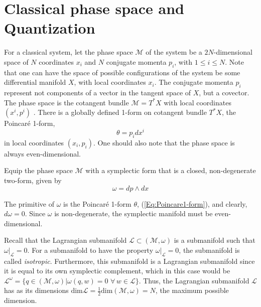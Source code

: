 \documentclass[a4paper,titlepage,twoside]{book}
\begin{document}
\section{Classical phase space and Quantization } \label{sec:easyclassicalquantum}


For a classical system, let the phase space $\mathcal{M}$ of the system be a $2N$-dimensional space of $N$ coordinates $x_i$ and $N$ conjugate momenta $p_i$, with $1 \leq i \leq N$.  Note that one can have the space of possible configurations of the system be some differential manifold $X$, with local coordinates $x_i$.  The conjugate momenta $p_i$ represent not components of a vector in the tangent space of $X$, but a covector.  The phase space is the cotangent bundle $\mathcal{M} = T^*X$ with local coordinates $(x^i, p^i)$ \cite{Frankel2011}.  There is a globally defined 1-form on cotangent bundle $T^*X$, the Poincar\'{e} 1-form, 
\begin{equation}
\theta =  p_i dx^i \label{Eq:Poincare1-form}
\end{equation}
in local coordinates $(x_i,p_i)$.  One should also note that the phase space is always even-dimensional.  

Equip the phase space $\mathcal{M}$ with a symplectic form that is a closed, non-degenerate two-form, given by 
\begin{equation}
  \omega  =dp \wedge dx  \label{eq:symplecticform00}
\end{equation}

The primitive of $\omega$ is the Poincar\'{e} 1-form $\theta$, (\ref{Eq:Poincare1-form}), and clearly, $d\omega =0$.  Since $\omega$ is non-degenerate, the symplectic manifold must be even-dimensional.

Recall that the Lagrangian submanifold $\mathcal{L} \subset (\mathcal{M}, \omega)$ is a submanifold such that $\left. \omega \right|_{\mathcal{L}}  =0$.  For a submanifold to have the property $\left. \omega \right|_{\mathcal{L}} =0$, the submanifold is called \emph{isotropic}.  Furthermore, this submanifold is a Lagrangian submanifold since it is equal to its own symplectic complement, which in this case would be $\mathcal{L}^{\omega} = \lbrace q \in (\mathcal{M}, \omega) | \omega( q, w) = 0 \, \, \forall \, w \in \mathcal{L}\rbrace$.  Thus, the Lagrangian submanifold $\mathcal{L}$ has as its dimensions $\text{dim}{ \mathcal{L}} = \frac{1}{2} \text{dim}{ ( \mathcal{M}, \omega)} = N$, the maximum possible dimension.
\end{document}
